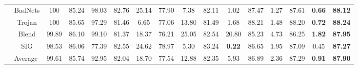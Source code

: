 \begin{table*}[t]
\begin{tabular}{c|c|cc|cc|cc|cc|cc|cc|cc}
& BadNets & 100 & 85.24 & 98.03 & 82.76 & 25.14 & 77.90 & 7.38 & 82.11 & 1.02 & 87.47&1.27&87.61& \bf0.66&\bf88.12 \\
 & Trojan & 100 & 85.65 & 97.29 & 81.46 & 6.65 & 77.06 & 13.80 & 81.49 & 1.68 & 88.21&1.48&88.20&\bf 0.72& \bf88.24 \\
 & Blend & 99.89 & 86.10 & 99.10 & 81.37 & 18.37 & 76.21 & 25.05 & 82.54 & 20.80 & 85.23&4.73&86.25&\bf1.82& \bf87.95 \\ 
 & SIG & 98.53 & 86.06 & 77.39 & 82.55 & 24.62 & 78.97 & 5.30 & 83.24 & \textbf{0.22} & 86.65 &1.95&87.09&0.45&\bf87.27\\
\cline{2-16} 
 & \multicolumn{1}{l}{Average} & \multicolumn{1}{|l}{99.61} & \multicolumn{1}{l}{85.74} & \multicolumn{1}{|l}{92.95} & \multicolumn{1}{l}{82.04} & \multicolumn{1}{|l}{18.70} & \multicolumn{1}{l}{77.54} & \multicolumn{1}{|l}{12.88} & \multicolumn{1}{l}{82.35} & \multicolumn{1}{|c}{5.93} & \multicolumn{1}{c}{86.89}& \multicolumn{1}{|c}{2.36} & \multicolumn{1}{c}{87.29} &\multicolumn{1}{|c}{\textbf{0.91}} & \multicolumn{1}{c}{\textbf{87.90}} \\
 \bottomrule
\end{tabular}
\label{core experiment}
\vspace{-0.1in}
\end{table*}

